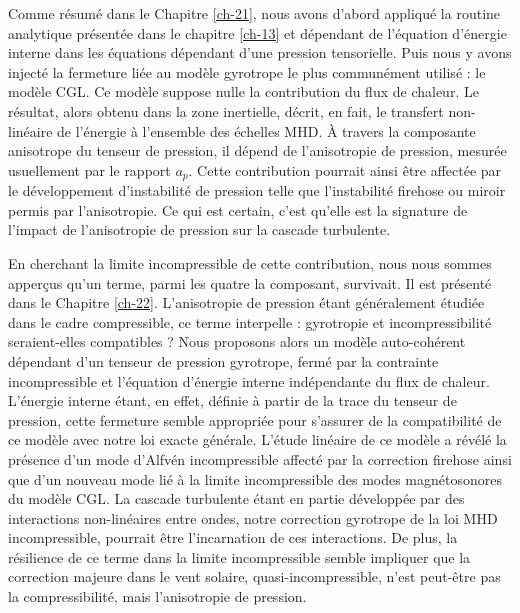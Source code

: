 Comme résumé dans le Chapitre \ref{ch-21}, nous avons d'abord appliqué la routine analytique présentée dans le chapitre \ref{ch-13} et dépendant de l'équation d'énergie interne dans les équations dépendant d'une pression tensorielle. Puis nous y avons injecté la fermeture liée au modèle gyrotrope le plus communément utilisé : le modèle \ac{CGL}. Ce modèle suppose nulle la contribution du flux de chaleur. Le résultat, alors obtenu dans la zone inertielle, décrit, en fait, le transfert non-linéaire de l'énergie à l'ensemble des échelles \ac{MHD}. À travers la composante anisotrope du tenseur de pression, il dépend de l'anisotropie de pression, mesurée usuellement par le rapport $a_p$. Cette contribution pourrait ainsi être affectée par le développement d'instabilité de pression telle que l'instabilité firehose ou miroir permis par l'anisotropie. Ce qui est certain, c'est qu'elle est la signature de l'impact de l'anisotropie de pression sur la cascade turbulente. 

En cherchant la limite incompressible de cette contribution, nous nous sommes apperçus qu'un terme, parmi les quatre la composant, survivait. Il est présenté dans le Chapitre \ref{ch-22}. L'anisotropie de pression étant généralement étudiée dans le cadre compressible, ce terme interpelle : gyrotropie et incompressibilité seraient-elles compatibles ? Nous proposons alors un modèle auto-cohérent dépendant d'un tenseur de pression gyrotrope, fermé par la contrainte incompressible et l'équation d'énergie interne indépendante du flux de chaleur. L'énergie interne étant, en effet, définie à partir de la trace du tenseur de pression, cette fermeture semble appropriée pour s'assurer de la compatibilité de ce modèle avec notre loi exacte générale. L'étude linéaire de ce modèle a révélé la présence d'un mode d'Alfvén incompressible affecté par la correction firehose ainsi que d'un nouveau mode lié à la limite incompressible des modes magnétosonores du modèle \ac{CGL}. La cascade turbulente étant en partie développée par des interactions non-linéaires entre ondes, notre correction gyrotrope de la loi \ac{MHD} incompressible, pourrait être l'incarnation de ces interactions. De plus, la résilience de ce terme dans la limite incompressible semble impliquer que la correction majeure dans le vent solaire, quasi-incompressible, n'est peut-être pas la compressibilité, mais l'anisotropie de pression. 

